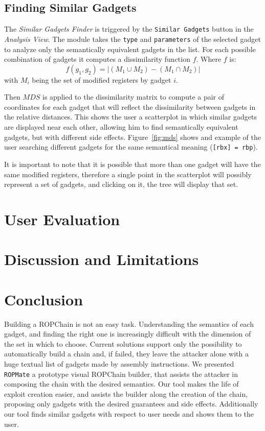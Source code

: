 \documentclass[twocolumn, 11pt]{article}
\begin{document}
\subsection{Finding Similar Gadgets}
The \textit{Similar Gadgets Finder} is triggered by the \texttt{Similar Gadgets} button in the \textit{Analysis View}. The module takes the \texttt{type} and \texttt{parameters} of the selected gadget to analyze only the semantically equivalent gadgets in the list. For each possible combination of gadgets it computes a dissimilarity function $f$. Where $f$ is:
$$
f(g_1, g_2) = |(M_1 \cup M_2) - (M_1 \cap M_2)|
$$
with $M_i$ being the set of modified registers by gadget $i$.

Then $MDS$ is applied to the dissimilarity matrix to compute a pair of coordinates for each gadget that will reflect the dissimilarity between gadgets in the relative distances. This shows the user a scatterplot in which similar gadgets are displayed near each other, allowing him to find semantically equivalent gadgets, but with different side effects. Figure~\ref{fig:mds} shows and example of the user searching different gadgets for the same semantical meaning (\texttt{[rbx] = rbp}).

It is important to note that it is possible that more than one gadget will have the same modified registers, therefore a single point in the scatterplot will possibly represent a set of gadgets, and clicking on it, the tree will display that set.

\section{User Evaluation}

\section{Discussion and Limitations}

\section{Conclusion}
Building a ROPChain is not an easy task. Understanding the semantics of each gadget, and finding the right one is increasingly difficult with the dimension of the set in which to choose. Current solutions support only the possibility to automatically build a chain and, if failed, they leave the attacker alone with a huge textual list of gadgets made by assembly instructions.
We presented \texttt{ROPMate} a prototype visual ROPChain builder, that assists the attacker in composing the chain with the desired semantics. Our tool makes the life of exploit creation easier, and assists the builder along the creation of the chain, proposing only gadgets with the desired guarantees and side effects. Additionally our tool finds similar gadgets with respect to user needs and shows them to the user.
\end{document}
